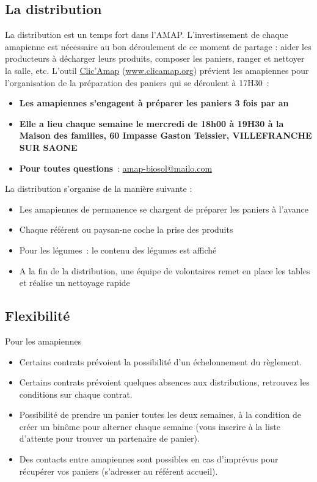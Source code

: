 \documentclass[10pt,a4paper,french]{article}
\makeatletter
\newcommand{\authoredby}[1]{\addtocontents{toc}{\protect\@nameuse{authoredby#1}}}%
\makeatother
\begin{document}
\authoredby{B}
\subsection{La distribution}\label{subsec:distribution}

\noindent La distribution est un temps fort dans l'AMAP. L'investissement de
chaque amapienne est nécessaire au bon déroulement de ce moment de
partage : aider les producteurs à décharger leurs produits, composer
les paniers, ranger et nettoyer la salle, etc.
L'outil \href{https://www.clicamap.org/}{Clic'Amap}
(\href{https://www.clicamap.org/}{www.clicamap.org})
prévient les amapiennes pour l'organisation de {\color{ForestGreen} la préparation des paniers qui se déroulent à 17H30}\ :
\begin{itemize}[label=]
\item {\bf Les amapiennes s'engagent à préparer les paniers 3 fois par an}
\item {\bf Elle a lieu chaque semaine le mercredi de 18h00 à 19H30 à la Maison des familles, 60 Impasse Gaston Teissier, VILLEFRANCHE SUR SAONE}
\item {\bf Pour toutes questions}\ : \href{mailto:amap-biosol@mailo.com}{amap-biosol@mailo.com}
\end{itemize}

\noindent La distribution s'organise de la manière suivante :
\begin{itemize}[label=]
\item Les amapiennes de permanence se chargent de préparer les paniers à l'avance
\item Chaque référent ou paysan-ne coche la prise des produits
\item Pour les légumes\ : le contenu des légumes est affiché 
\item A la fin de la distribution, une équipe de volontaires remet en place les tables et réalise un nettoyage rapide
\end{itemize}

\authoredby{B}
\subsection{Flexibilité}\label{subsec:flexibilité}

\noindent Pour les amapiennes
\begin{itemize}[label=]
\item Certains contrats prévoient la possibilité d'un échelonnement du règlement.
\item Certains contrats prévoient quelques absences aux distributions, retrouvez les conditions sur chaque contrat.
\item Possibilité de prendre un panier toutes les deux semaines, à la condition de créer un binôme pour alterner chaque semaine (vous inscrire à la liste d'attente pour trouver un partenaire de panier).
\item Des contacts entre amapiennes sont possibles en cas d'imprévus pour récupérer vos paniers (s'adresser au référent accueil).
\end{itemize}
\end{document}
